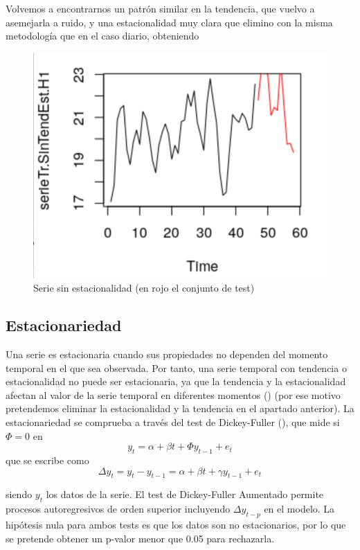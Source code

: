Volvemos a encontrarnos un patrón similar en la tendencia, que vuelvo a asemejarla a ruido, y una estacionalidad muy clara que elimino con la misma metodología que en el caso diario, obteniendo

\begin{figure}[H] %
	\centering
	\includegraphics[scale=0.31]{trtsNE-mensual.png}  %
	\caption{Serie sin estacionalidad (en rojo el conjunto de test)} 
	\label{fig:trtsNE-mensual}
\end{figure}

\subsection{Estacionariedad}

Una serie es estacionaria cuando sus propiedades no dependen del momento temporal en el que sea observada. Por tanto, una serie temporal con tendencia o estacionalidad no puede ser estacionaria, ya que la tendencia y la estacionalidad afectan al valor de la serie temporal en diferentes momentos (\cite{hyndman}) (por ese motivo pretendemos eliminar la estacionalidad y la tendencia en el apartado anterior). La estacionariedad se comprueba a través del test de Dickey-Fuller (\cite{df}), que mide si $\Phi = 0$ en
$$y_t = \alpha + \beta t + \Phi y_{t-1} +e_t$$
que se escribe como
$$\Delta y_t = y_t - y_{t-1} = \alpha + \beta t + \gamma y_{t-1} +e_t$$

siendo $y_t$ los datos de la serie. El test de Dickey-Fuller Aumentado permite procesos autoregresivos de orden superior incluyendo $\Delta y_{t-p}$ en el modelo. La hipótesis nula para ambos tests es que los datos son no estacionarios, por lo que se pretende obtener un p-valor menor que 0.05 para rechazarla. 

